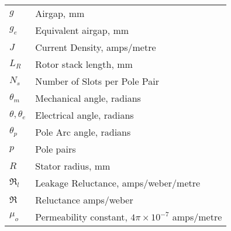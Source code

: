 \label{glossary}
\begin{singlespacing}
\begin{longtable}{p{} p{}}
$g$ & Airgap, mm\\
$g_e$ & Equivalent airgap, mm\\
$J$ & Current Density, amps/metre\\
$L_R$ & Rotor stack length, mm\\
$N_s$ & Number of Slots per Pole Pair\\
$\theta_m$ & Mechanical angle, radians\\
$\theta, \theta_e$ & Electrical angle, radians\\
$\theta_p$ & Pole Arc angle, radians\\
$p$ & Pole pairs\\
$R$ & Stator radius, mm\\
$\Re_l$ & Leakage Reluctance, amps/weber/metre\\
$\Re$ & Reluctance amps/weber\\
$\mu_o$ & Permeability constant, $4\pi \times 10^{-7}$ amps/metre\\

\end{longtable}
\end{singlespacing}
